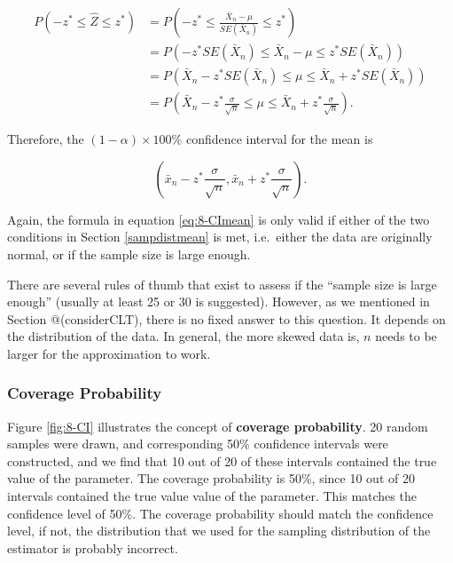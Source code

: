\documentclass[
]{book}
\begin{document}
\begin{equation} 
\begin{split}
P(-z^{*} \leq \hat{Z} \leq z^{*}) &= P(-z^{*} \leq \frac{\bar{X}_n - \mu}{SE(\bar{X}_n)} \leq z^{*}) \\
                                  &= P\left(-z^{*}SE(\bar{X}_n) \leq \bar{X}_n - \mu \leq z^{*}SE(\bar{X}_n)\right) \\
                                  &= P\left(\bar{X}_n - z^{*}SE(\bar{X}_n) \leq \mu \leq \bar{X}_n + z^{*}SE(\bar{X}_n)\right) \\
                                  &= P\left(\bar{X}_n - z^{*} \frac{\sigma}{\sqrt{n}} \leq \mu \leq \bar{X}_n + z^{*} \frac{\sigma}{\sqrt{n}}\right).
\end{split}
\label{eq:8-CImeanwork}
\end{equation}

Therefore, the \((1-\alpha) \times 100\%\) confidence interval for the mean is

\begin{equation} 
\left( \bar{x}_n - z^{*} \frac{\sigma}{\sqrt{n}}, \bar{x}_n + z^{*} \frac{\sigma}{\sqrt{n}} \right).
\label{eq:8-CImean}
\end{equation}

Again, the formula in equation \eqref{eq:8-CImean} is only valid if either of the two conditions in Section \ref{sampdistmean} is met, i.e.~either the data are originally normal, or if the sample size is large enough.

There are several rules of thumb that exist to assess if the ``sample size is large enough'' (usually at least 25 or 30 is suggested). However, as we mentioned in Section @(considerCLT), there is no fixed answer to this question. It depends on the distribution of the data. In general, the more skewed data is, \(n\) needs to be larger for the approximation to work.

\subsubsection{Coverage Probability}\label{CP}

Figure \ref{fig:8-CI} illustrates the concept of \textbf{coverage probability}. 20 random samples were drawn, and corresponding 50\% confidence intervals were constructed, and we find that 10 out of 20 of these intervals contained the true value of the parameter. The coverage probability is 50\%, since 10 out of 20 intervals contained the true value value of the parameter. This matches the confidence level of 50\%. The coverage probability should match the confidence level, if not, the distribution that we used for the sampling distribution of the estimator is probably incorrect.
\end{document}
